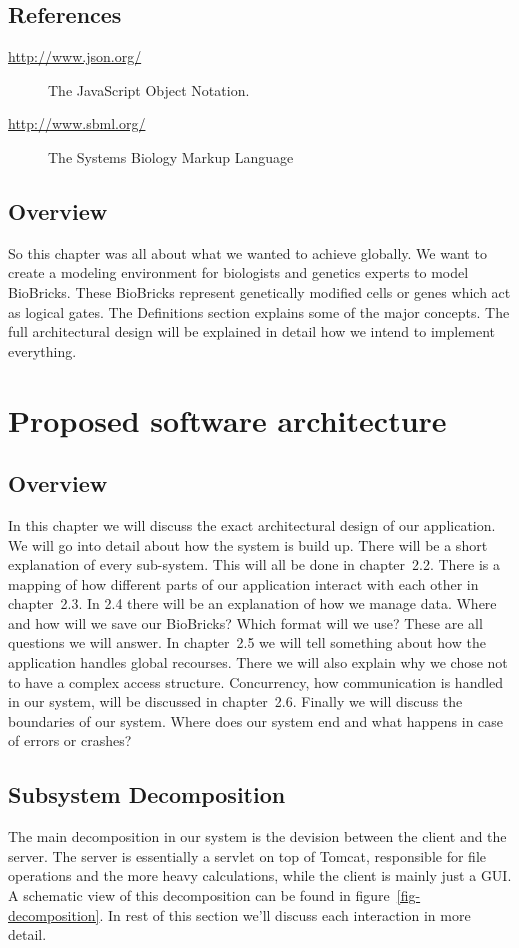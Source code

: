 \documentclass[a4paper]{article}
\begin{document}
\subsection{References}
\begin{description}
	\item[\url{http://www.json.org/}] The JavaScript Object Notation.
	\item[\url{http://www.sbml.org/}] The Systems Biology Markup Language
\end{description}

\subsection{Overview}
So this chapter was all about what we wanted to achieve globally. We want to create a modeling environment for biologists and genetics experts to model BioBricks. These BioBricks represent genetically modified cells or genes which act as logical gates. The Definitions section explains some of the major concepts. The full architectural design will be explained in detail how we intend to implement everything.

\section{Proposed software architecture}
\subsection{Overview}
In this chapter we will discuss the exact architectural design of our application. We will go into detail about how the system is build up. There will be a short explanation of every sub-system. This will all be done in chapter~2.2. There is a mapping of how different parts of our application interact with each other in chapter~2.3. In 2.4 there will be an explanation of how we manage data. Where and how will we save our BioBricks? Which format will we use? These are all questions we will answer. In chapter~2.5 we will tell something about how the application handles global recourses. There we will also explain why we chose not to have a complex access structure. Concurrency, how communication is handled in our system, will be discussed in chapter~2.6. Finally we will discuss the boundaries of our system. Where does our system end and what happens in case of errors or crashes? 

\subsection{Subsystem Decomposition}
The main decomposition in our system is the devision between the client and the server. The server is essentially a servlet on top of Tomcat, responsible for file operations and the more heavy calculations, while the client is mainly just a GUI. A schematic view of this decomposition can be found in figure~\ref{fig-decomposition}. In rest of this section we'll discuss each interaction in more detail.
\end{document}
